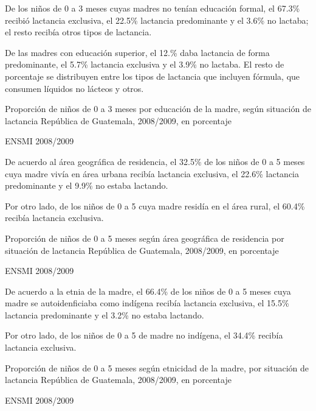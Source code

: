 
%
{%
De los niños de 0 a 3 meses cuyas madres no tenían educación formal, el 67.3\% recibió lactancia exclusiva, el 22.5\% lactancia predominante y el 3.6\% no lactaba; el resto recibía otros tipos de lactancia.

De las madres con educación superior, el 12.\% daba lactancia de forma predominante, el 5.7\% lactancia exclusiva y el 3.9\% no lactaba. El resto de porcentaje se distribuyen entre los tipos de lactancia que incluyen fórmula, que consumen líquidos no lácteos y otros.}%
{%
	Proporción de niños de 0 a 3 meses por educación de la madre, según situación de lactancia
} %
{%
	República de Guatemala, 2008/2009, en porcentaje} %
{%
	\begin{tikzpicture}[x=1pt,y=1pt]    \end{tikzpicture}
}%
{%
	ENSMI 2008/2009} %


%
{%
De acuerdo al área geográfica de residencia, el 32.5\% de los niños de 0 a 5 meses cuya madre vivía en área urbana recibía lactancia exclusiva, el 22.6\% lactancia predominante y el 9.9\% no estaba lactando.

Por otro lado, de los niños de 0 a 5 cuya madre residía en el área rural, el 60.4\% recibía lactancia exclusiva.}%
{%
	Proporción de niños de 0 a 5 meses según área geográfica de residencia por situación de lactancia
} %
{%
	República de Guatemala, 2008/2009, en porcentaje} %
{%
	\begin{tikzpicture}[x=1pt,y=1pt]    \end{tikzpicture}
}%
{%
	ENSMI 2008/2009} %



%
{%
De acuerdo a la etnia de la madre, el 66.4\% de los niños de 0 a 5 meses cuya madre se autoidenficiaba como indígena recibía lactancia exclusiva, el 15.5\% lactancia predominante y el 3.2\% no estaba lactando.

Por otro lado, de los niños de 0 a 5 de madre no indígena, el 34.4\% recibía lactancia exclusiva.}%
{%
	Proporción de niños de 0 a 5 meses según etnicidad de la madre, por situación de lactancia
} %
{%
	República de Guatemala, 2008/2009, en porcentaje} %
{%
	\begin{tikzpicture}[x=1pt,y=1pt]    \end{tikzpicture}
}%
{%
	ENSMI 2008/2009} %


